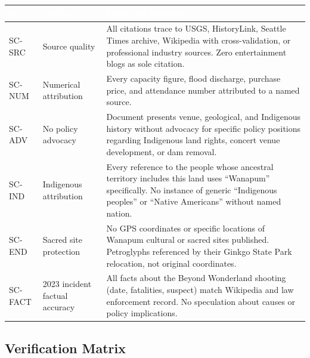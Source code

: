 \documentclass[11pt,letterpaper]{article}
\newcommand{\tableheader}[1]{\textbf{\sffamily\textcolor{white}{#1}}}
\begin{document}
\begin{center}
\begin{tabularx}{\textwidth}{L{1.5cm}L{3.5cm}X}
\toprule
{}
\tableheader{ID} & \tableheader{Verifies} & \tableheader{Expected Behavior} \\
\midrule
SC-SRC & Source quality & All citations trace to USGS, HistoryLink, Seattle Times archive, Wikipedia with cross-validation, or professional industry sources. Zero entertainment blogs as sole citation. \\
SC-NUM & Numerical attribution & Every capacity figure, flood discharge, purchase price, and attendance number attributed to a named source. \\
SC-ADV & No policy advocacy & Document presents venue, geological, and Indigenous history without advocacy for specific policy positions regarding Indigenous land rights, concert venue development, or dam removal. \\
SC-IND & Indigenous attribution & Every reference to the people whose ancestral territory includes this land uses ``Wanapum'' specifically. No instance of generic ``Indigenous peoples'' or ``Native Americans'' without named nation. \\
SC-END & Sacred site protection & No GPS coordinates or specific locations of Wanapum cultural or sacred sites published. Petroglyphs referenced by their Ginkgo State Park relocation, not original coordinates. \\
SC-FACT & 2023 incident factual accuracy & All facts about the Beyond Wonderland shooting (date, fatalities, suspect) match Wikipedia and law enforcement record. No speculation about causes or policy implications. \\
\bottomrule
\end{tabularx}
\end{center}

\subsection{Verification Matrix}
\end{document}

